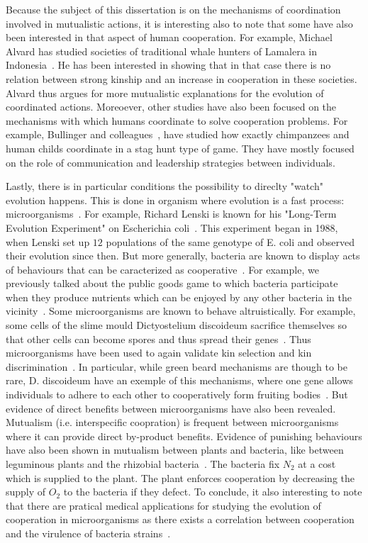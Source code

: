     Because the subject of this dissertation is on the mechanisms of coordination involved in mutualistic actions, it is interesting also to note that some have also been interested in that aspect of human cooperation. For example, Michael Alvard has studied societies of traditional whale hunters of Lamalera in Indonesia~\cite{Alvard2001, Alvard2003}. He has been interested in showing that in that case there is no relation between strong kinship and an increase in cooperation in these societies. Alvard thus argues for more mutualistic explanations for the evolution of coordinated actions. Moreoever, other studies have also been focused on the mechanisms with which humans coordinate to solve cooperation problems. For example, Bullinger and colleagues~\cite{Bullinger2011, Duguid2014}, have studied how exactly chimpanzees and human childs coordinate in a stag hunt type of game. They have mostly focused on the role of communication and leadership strategies between individuals.

    Lastly, there is in particular conditions the possibility to direclty "watch" evolution happens. This is done in organism where evolution is a fast process: microorganisms~\cite{Elena2003}. For example, Richard Lenski is known for his "Long-Term Evolution Experiment" on Escherichia coli~\cite{Fox2015}. This experiment began in 1988, when Lenski set up $12$ populations of the same genotype of E. coli and observed their evolution since then. But more generally, bacteria are known to display acts of behaviours that can be caracterized as cooperative~\cite{West2006}. For example, we previously talked about the public goods game to which bacteria participate when they produce nutrients which can be enjoyed by any other bacteria in the vicinity~\cite{Harrison2013}. Some microorganisms are known to behave altruistically. For example, some cells of the slime mould Dictyostelium discoideum sacrifice themselves so that other cells can become spores and thus spread their genes~\cite{Strassmann2000}. Thus microorganisms have been used to again validate kin selection and kin discrimination~\cite{West2006}. In particular, while green beard mechanisms are though to be rare, D. discoideum have an exemple of this mechanisms, where one gene allows individuals to adhere to each other to cooperatively form fruiting bodies~\cite{Queller2003}. But evidence of direct benefits between microorganisms have also been revealed. Mutualism (i.e. interspecific coopration) is frequent between microorganisms where it can provide direct by-product benefits. Evidence of punishing behaviours have also been shown in mutualism between plants and bacteria, like between leguminous plants and the rhizobial bacteria~\cite{Kiers2003}. The bacteria fix $N_{2}$ at a cost which is supplied to the plant. The plant enforces cooperation by decreasing the supply of $O_{2}$ to the bacteria if they defect. To conclude, it also interesting to note that there are pratical medical applications for studying the evolution of cooperation in microorganisms as there exists a correlation between cooperation and the virulence of bacteria strains~\cite{Foster2005}.


